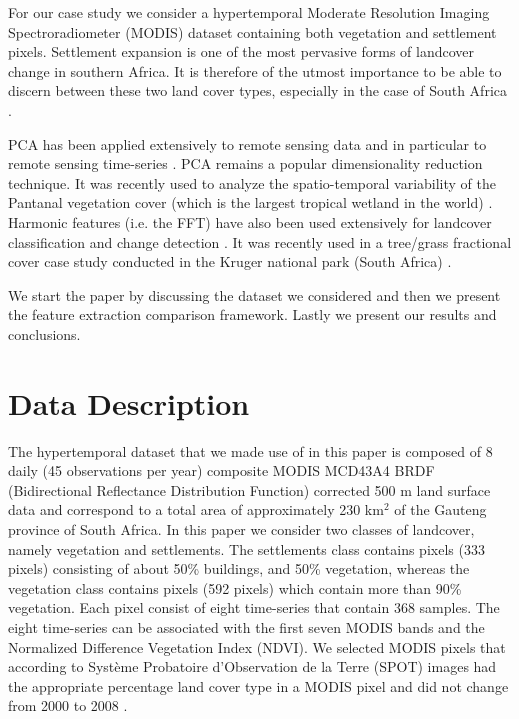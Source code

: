 \documentclass{article}
\begin{document}
For our case study we consider a hypertemporal Moderate Resolution Imaging Spectroradiometer (MODIS) dataset containing both vegetation and settlement pixels.
Settlement expansion is one of the most pervasive forms of landcover change in southern Africa. It is therefore of the utmost importance to be able to discern 
between these two land cover types, especially in the case of South Africa \cite{grobler2012}. 

PCA has been applied extensively to remote sensing data \cite{byrne1980} and in particular to remote sensing time-series \cite{hall2003}. PCA remains a popular dimensionality reduction technique. It was recently used to analyze the spatio-temporal variability of 
the Pantanal vegetation cover (which is the largest tropical wetland in the world) \cite{almeida2015}.  %
Harmonic features (i.e. the FFT) have also been used extensively for landcover classification and change detection \cite{jakubauskas2002}. It was recently used in a tree/grass fractional cover case study conducted in 
the Kruger national park (South Africa) \cite{ibrahim2018}. 

We start the paper by discussing the dataset we considered and then we present the feature extraction comparison framework. Lastly we present our results and conclusions.

\section{Data Description}
\label{sec:data}
The hypertemporal dataset that we made use of in this paper is composed of 8 daily (45 observations per year) composite MODIS MCD43A4 BRDF (Bidirectional Reflectance Distribution Function) corrected 500 m land surface
data and correspond to a total area of approximately 230 km$^2$ of the Gauteng province of South Africa. In this paper we consider two classes of landcover, namely vegetation and settlements. The settlements class contains pixels (333 pixels) consisting of about
50\% buildings, and 50\% vegetation, whereas the vegetation class contains pixels (592 pixels) which contain more than 90\% vegetation. Each pixel consist of eight time-series that contain 368 samples. The eight time-series can be associated with the first seven MODIS bands and the Normalized Difference Vegetation Index (NDVI).
We selected MODIS pixels that according to Système Probatoire d’Observation de la Terre (SPOT) images had the appropriate percentage land cover type in a MODIS pixel and did not change from 2000 to 2008 \cite{grobler2012}.
\end{document}

